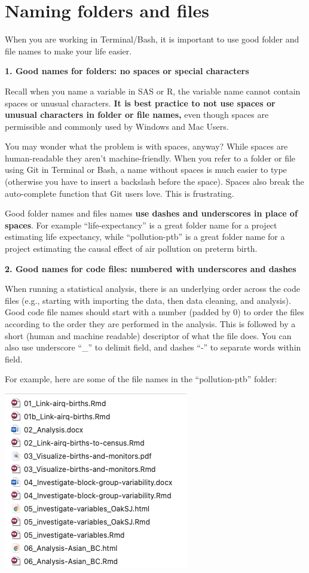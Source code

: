 \documentclass[
]{book}
\begin{document}
\chapter{Naming folders and files}\label{naming-folders-and-files}

When you are working in Terminal/Bash, it is important to use good folder and
file names to make your life easier.

\textbf{1. Good names for folders: no spaces or special characters}

Recall when you name a variable in SAS or R, the variable name cannot contain spaces or unusual characters. \textbf{It is best practice to not use spaces or unusual characters in folder or file names,} even though spaces are permissible and commonly used by Windows and Mac Users.

You may wonder what the problem is with spaces, anyway? While
spaces are human-readable they aren't machine-friendly. When you refer to a
folder or file using Git in Terminal or Bash, a name without spaces is much
easier to type (otherwise you have to insert a backslash before the space).
Spaces also break the auto-complete function that Git users love. This is
frustrating.

Good folder names and files names \textbf{use dashes and underscores in place of spaces}.
For example ``life-expectancy'' is a great folder name for a project estimating
life expectancy, while ``pollution-ptb'' is a great folder name for a project
estimating the causal effect of air pollution on preterm birth.

\textbf{2. Good names for code files: numbered with underscores and dashes}

When running a statistical analysis, there is an underlying order across the
code files (e.g., starting with importing the data, then data cleaning, and
analysis). Good code file names should start with a number (padded by 0)
to order the files according to the order they are performed in the analysis. This is
followed by a short (human and machine readable) descriptor of what the file
does. You can also use underscore ``\_'' to delimit field, and dashes ``-'' to
separate words within field.

For example, here are some of the file names in the ``pollution-ptb'' folder:

\includegraphics[width=0.5\linewidth]{./figures/Variable-names-example}
\end{document}
